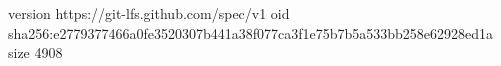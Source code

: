 version https://git-lfs.github.com/spec/v1
oid sha256:e2779377466a0fe3520307b441a38f077ca3f1e75b7b5a533bb258e62928ed1a
size 4908
